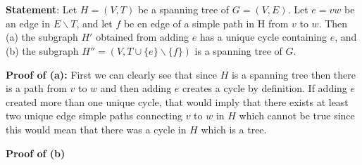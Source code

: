 \documentclass{article}
\begin{document}
\section{}
\textbf{Statement}: Let $H = (V,T)$ be a spanning tree of $G = (V,E)$. Let $e = vw$ be an edge in $E \backslash T$, and let $f$ be en edge of a simple path in H from $v$ to $w$. Then (a) the subgraph $H'$ obtained from adding $e$ has a unique cycle containing $e$, and (b) the subgraph $H'' = (V,T \cup \{e\} \backslash \{f\})$ is a spanning tree of $G$.

\textbf{Proof of (a):} First we can clearly see that since $H$ is a spanning tree then there is a path from $v$ to $w$ and then adding $e$ creates a cycle by definition. If adding $e$ created more than one unique cycle, that would imply that there exists at least two unique edge simple paths connecting $v$ to $w$ in $H$ which cannot be true since this would mean that there was a cycle in $H$ which is a tree. 

\textbf{Proof of (b)} 


     


 
\end{document}
